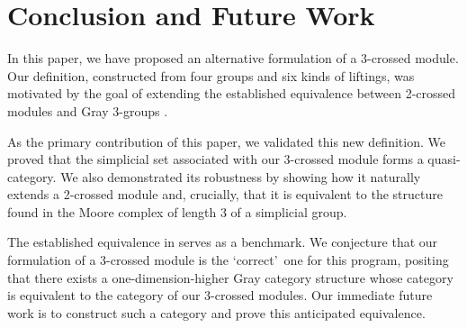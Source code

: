 \documentclass{tac}
\begin{document}
\section{Conclusion and Future Work}

In this paper, we have proposed an alternative formulation of a 3-crossed module. Our definition, constructed from four groups and six kinds of liftings, was motivated by the goal of extending the established equivalence between 2-crossed modules and Gray 3-groups \cite{SarikayaUlualan2024}.

As the primary contribution of this paper, we validated this new definition. We proved that the simplicial set associated with our 3-crossed module forms a quasi-category. We also demonstrated its robustness by showing how it naturally extends a 2-crossed module and, crucially, that it is equivalent to the structure found in the Moore complex of length 3 of a simplicial group.

The established equivalence in \cite{SarikayaUlualan2024} serves as a benchmark. We conjecture that our formulation of a 3-crossed module is the \lq correct\rq \ one for this program, positing that there exists a one-dimension-higher Gray category structure whose category is equivalent to the category of our 3-crossed modules. Our immediate future work is to construct such a category and prove this anticipated equivalence.
\end{document}
